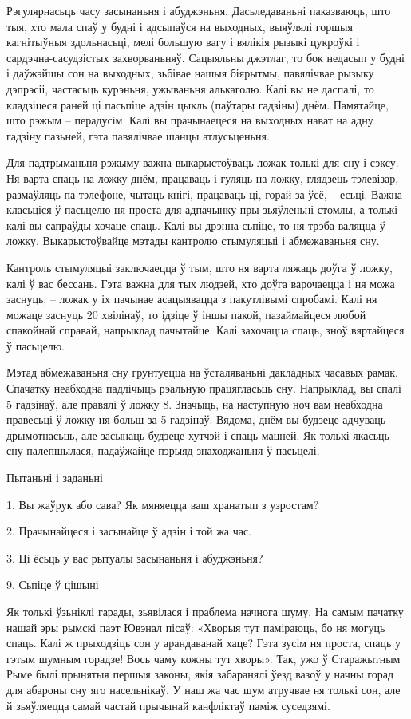 Рэгулярнасьць часу засынаньня і абуджэньня. Дасьледаваньні паказваюць, што тыя, хто мала спаў у будні і адсыпаўся на выходных, выяўлялі горшыя кагнітыўныя здольнасьці, мелі большую вагу і вялікія рызыкі цукроўкі і сардэчна-сасудзістых захворваньняў. Сацыяльны джэтлаг, то бок недасып у будні і даўжэйшы сон на выходных, зьбівае нашыя біярытмы, павялічвае рызыку дэпрэсіі, частасьць курэньня, ужываньня алькаголю. Калі вы не даспалі, то кладзіцеся раней ці пасьпіце адзін цыкль (паўтары гадзіны) днём. Памятайце, што рэжым – перадусім. Калі вы прачынаецеся на выходных нават на адну гадзіну пазьней, гэта павялічвае шанцы атлусьценьня.

Для падтрыманьня рэжыму важна выкарыстоўваць ложак толькі для сну і сэксу. Ня варта спаць на ложку днём, працаваць і гуляць на ложку, глядзець тэлевізар, размаўляць па тэлефоне, чытаць кнігі, працаваць ці, горай за ўсё, – есьці. Важна класьціся ў пасьцелю ня проста для адпачынку пры зьяўленьні стомлы, а толькі калі вы сапраўды хочаце спаць. Калі вы дрэнна сьпіце, то ня трэба валяцца ў ложку. Выкарыстоўвайце мэтады кантролю стымуляцыі і абмежаваньня сну.

Кантроль стымуляцыі заключаецца ў тым, што ня варта ляжаць доўга ў ложку, калі ў вас бессань. Гэта важна для тых людзей, хто доўга варочаецца і ня можа заснуць, – ложак у іх пачынае асацыявацца з пакутлівымі спробамі. Калі ня можаце заснуць 20 хвілінаў, то ідзіце ў іншы пакой, пазаймайцеся любой спакойнай справай, напрыклад пачытайце. Калі захочацца спаць, зноў вяртайцеся ў пасьцелю.

Мэтад абмежаваньня сну грунтуецца на ўсталяваньні дакладных часавых рамак. Спачатку неабходна падлічыць рэальную працягласьць сну. Напрыклад, вы спалі 5 гадзінаў, але правялі ў ложку 8. Значыць, на наступную ноч вам неабходна правесьці ў ложку ня больш за 5 гадзінаў. Вядома, днём вы будзеце адчуваць дрымотнасьць, але засынаць будзеце хутчэй і спаць мацней. Як толькі якасьць сну палепшылася, падаўжайце пэрыяд знаходжаньня ў пасьцелі.

Пытаньні і заданьні

1. Вы жаўрук або сава? Як мяняецца ваш хранатып з узростам?

2. Прачынайцеся і засынайце ў адзін і той жа час.

3. Ці ёсьць у вас рытуалы засынаньня і абуджэньня?


9. Сьпіце ў цішыні

Як толькі ўзьніклі гарады, зьявілася і праблема начнога шуму. На самым пачатку нашай эры рымскі паэт Ювэнал пісаў: «Хворыя тут паміраюць, бо ня могуць спаць. Калі ж прыходзіць сон у арандаванай хаце? Гэта зусім ня проста, спаць у гэтым шумным горадзе! Вось чаму кожны тут хворы». Так, ужо ў Старажытным Рыме былі прынятыя першыя законы, якія забаранялі ўезд вазоў у начны горад для абароны сну яго насельнікаў. У наш жа час шум атручвае ня толькі сон, але й зьяўляецца самай частай прычынай канфліктаў паміж суседзямі.

